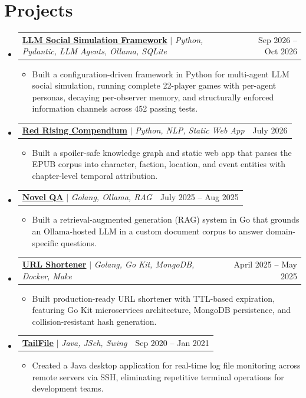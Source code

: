 \documentclass[letterpaper,11pt]{article}
\makeatletter
\newif\ifshortresume
\newcommand{\resumeItem}[1]{
  \item\small{
    {#1 \vspace{-2pt}}
  }
}
\newcommand{\resumeProjectHeading}[2]{
    \item
    \begin{tabular*}{0.97\textwidth}{l@{\extracolsep{\fill}}r}
      \small#1 & #2 \\
    \end{tabular*}\vspace{-7pt}
}
\newcommand{\resumeSubHeadingListStart}{\begin{itemize}[leftmargin=0.15in, label={}]}
\newcommand{\resumeSubHeadingListEnd}{\end{itemize}}
\newcommand{\resumeItemListStart}{\begin{itemize}}
\newcommand{\resumeItemListEnd}{\end{itemize}\vspace{-5pt}}
\makeatother
\begin{document}
\section{Projects}
    \resumeSubHeadingListStart
      \resumeProjectHeading
          {\textbf{\href{https://traitors-simulation-using-agents.vercel.app/}{LLM Social Simulation Framework}} $|$ \emph{Python, Pydantic, LLM Agents, Ollama, SQLite}}{Sep 2026 -- Oct 2026}
          \resumeItemListStart
            \resumeItem{Built a configuration-driven framework in Python for multi-agent LLM social simulation, running complete 22-player games with per-agent personas, decaying per-observer memory, and structurally enforced information channels across 452 passing tests.}
          \resumeItemListEnd
      \resumeProjectHeading
          {\textbf{\href{https://red-rising-compendium-lyart.vercel.app/\#/search}{Red Rising Compendium}} $|$ \emph{Python, NLP, Static Web App}}{July 2026}
          \resumeItemListStart
            \resumeItem{Built a spoiler-safe knowledge graph and static web app that parses the EPUB corpus into character, faction, location, and event entities with chapter-level temporal attribution.}
          \resumeItemListEnd
      \resumeProjectHeading
          {\textbf{\href{https://github.com/kweusuf/novel-qa}{Novel QA}} $|$ \emph{Golang, Ollama, RAG}}{July 2025 -- Aug 2025}
          \resumeItemListStart
            \resumeItem{Built a retrieval-augmented generation (RAG) system in Go that grounds an Ollama-hosted LLM in a custom document corpus to answer domain-specific questions.}
          \resumeItemListEnd
      \resumeProjectHeading
          {\textbf{\href{https://github.com/kweusuf/url-shortner}{URL Shortener}} $|$ \emph{Golang, Go Kit, MongoDB, Docker, Make}}{April 2025 -- May 2025}
          \resumeItemListStart
            \resumeItem{Built production-ready URL shortener with TTL-based expiration, featuring Go Kit microservices architecture, MongoDB persistence, and collision-resistant hash generation.}
          \resumeItemListEnd
      \ifshortresume\else
      \resumeProjectHeading
          {\textbf{\href{https://github.com/kweusuf/TailFile}{TailFile}} $|$ \emph{Java, JSch, Swing}}{Sep 2020 -- Jan 2021}
          \resumeItemListStart
            \resumeItem{Created a Java desktop application for real-time log file monitoring across remote servers via SSH, eliminating repetitive terminal operations for development teams.}
          \resumeItemListEnd
      \fi
    \resumeSubHeadingListEnd
\end{document}
